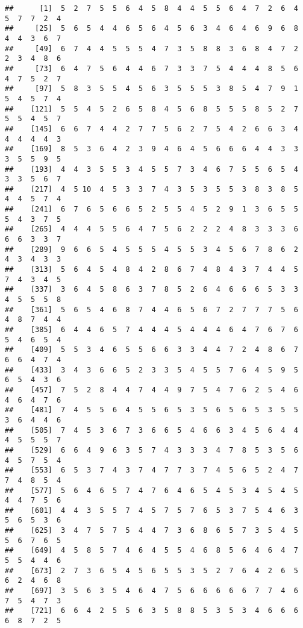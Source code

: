 \documentclass[
]{book}
\begin{document}
\begin{verbatim}
##      [1]  5  2  7  5  5  6  4  5  8  4  4  5  5  6  4  7  2  6  4  5  7  7  2  4
##     [25]  5  6  5  4  4  6  5  6  4  5  6  3  4  6  4  6  9  6  8  4  4  3  6  7
##     [49]  6  7  4  4  5  5  5  4  7  3  5  8  8  3  6  8  4  7  2  2  3  4  8  6
##     [73]  6  4  7  5  6  4  4  6  7  3  3  7  5  4  4  4  8  5  6  4  7  5  2  7
##     [97]  5  8  3  5  5  4  5  6  3  5  5  5  3  8  5  4  7  9  1  5  4  5  7  4
##    [121]  5  5  4  5  2  6  5  8  4  5  6  8  5  5  5  8  5  2  7  5  5  4  5  7
##    [145]  6  6  7  4  4  2  7  7  5  6  2  7  5  4  2  6  6  3  4  4  4  4  4  3
##    [169]  8  5  3  6  4  2  3  9  4  6  4  5  6  6  6  4  4  3  3  3  5  5  9  5
##    [193]  4  4  3  5  5  3  4  5  5  7  3  4  6  7  5  5  6  5  4  3  3  5  6  7
##    [217]  4  5 10  4  5  3  3  7  4  3  5  3  5  5  3  8  3  8  5  4  4  5  7  4
##    [241]  6  7  6  5  6  6  5  2  5  5  4  5  2  9  1  3  6  5  5  5  4  3  7  5
##    [265]  4  4  4  5  5  6  4  7  5  6  2  2  2  4  8  3  3  3  6  6  6  3  3  7
##    [289]  9  6  6  5  4  5  5  5  4  5  5  3  4  5  6  7  8  6  2  4  3  4  3  3
##    [313]  5  6  4  5  4  8  4  2  8  6  7  4  8  4  3  7  4  4  5  7  4  3  4  5
##    [337]  3  6  4  5  8  6  3  7  8  5  2  6  4  6  6  6  5  3  3  4  5  5  5  8
##    [361]  5  6  5  4  6  8  7  4  4  6  5  6  7  2  7  7  7  5  6  4  8  7  4  4
##    [385]  6  4  4  6  5  7  4  4  4  5  4  4  4  6  4  7  6  7  6  5  4  6  5  4
##    [409]  5  5  3  4  6  5  5  6  6  3  3  4  4  7  2  4  8  6  7  6  6  4  7  4
##    [433]  3  4  3  6  6  5  2  3  3  5  4  5  5  7  6  4  5  9  5  6  5  4  3  6
##    [457]  7  5  2  8  4  4  7  4  4  9  7  5  4  7  6  2  5  4  6  4  6  4  7  6
##    [481]  7  4  5  5  6  4  5  5  6  5  3  5  6  5  6  5  3  5  5  3  6  4  4  6
##    [505]  7  4  5  3  6  7  3  6  6  5  4  6  6  3  4  5  6  4  4  4  5  5  5  7
##    [529]  6  6  4  9  6  3  5  7  4  3  3  3  4  7  8  5  3  5  6  4  5  7  5  4
##    [553]  6  5  3  7  4  3  7  4  7  7  3  7  4  5  6  5  2  4  7  7  4  8  5  4
##    [577]  5  6  4  6  5  7  4  7  6  4  6  5  4  5  3  4  5  4  5  4  4  7  5  6
##    [601]  4  4  3  5  5  7  4  5  7  5  7  6  5  3  7  5  4  6  3  5  6  5  3  6
##    [625]  3  4  7  5  7  5  4  4  7  3  6  8  6  5  7  3  5  4  5  5  6  7  6  5
##    [649]  4  5  8  5  7  4  6  4  5  5  4  6  8  5  6  4  6  4  7  5  5  4  4  6
##    [673]  2  7  3  6  5  4  5  6  5  5  3  5  2  7  6  4  2  6  5  6  2  4  6  8
##    [697]  3  5  6  3  5  4  6  4  7  5  6  6  6  6  6  7  7  4  6  7  5  4  7  3
##    [721]  6  6  4  2  5  5  6  3  5  8  8  5  3  5  3  4  6  6  6  6  8  7  2  5

\end{verbatim}
\end{document}
